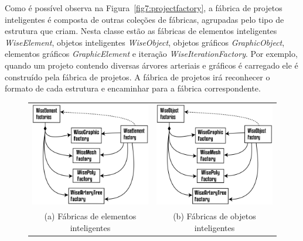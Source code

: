 Como é possível observa na Figura~\ref{fig7:projectfactory}, a fábrica de projetos inteligentes é composta de outras coleções de fábricas, agrupadas pelo tipo de estrutura que criam. Nesta classe estão as fábricas de elementos inteligentes \textit{WiseElement}, objetos inteligentes \textit{WiseObject}, objetos gráficos \textit{GraphicObject}, elementos gráficos \textit{GraphicElement} e iteração \textit{WiseIterationFactory}. Por exemplo, quando um projeto contendo diversas árvores arteriais e gráficos é carregado ele é construído pela fábrica de projetos. A fábrica de projetos irá reconhecer o formato de cada estrutura e encaminhar para a fábrica correspondente.

\begin{figure}
	\begin{tabularx}{\textwidth}{cc}
		\includegraphics[width=0.5\linewidth]{Figures/WiseElementFactories@16x.png} &   \includegraphics[width=0.5\linewidth]{Figures/WiseObjectFactories@16x.png} \\
		(a) Fábricas de elementos inteligentes & (b) Fábricas de objetos inteligentes \\[6pt]

\end{tabularx}
\end{figure}
